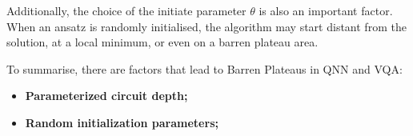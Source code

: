 Additionally, the choice of the initiate parameter $\theta$ is also an important factor. When an ansatz is randomly initialised, the algorithm may start distant from the solution, at a local minimum, or even on a barren plateau area. 

To summarise, there are factors that lead to Barren Plateaus in QNN and VQA:
\begin{itemize}
    \item \textbf{Parameterized circuit depth;}
    \item \textbf{Random initialization parameters;}
\end{itemize}